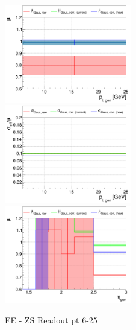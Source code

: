 \begin{figure}
\includegraphics[width=0.495\textwidth]{./plots_pdf/ECAL_plots/plotsNoPU/EE/pdf/ZS/GENPT/EEZS_GENPT_0006_0025_MuOverBins.pdf}
\includegraphics[width=0.495\textwidth]{./plots_pdf/ECAL_plots/plotsNoPU/EE/pdf/ZS/GENPT/EEZS_GENPT_0006_0025_EffSigmaOverBins.pdf}
\includegraphics[width=0.495\textwidth]{./plots_pdf/ECAL_plots/plotsNoPU/EE/pdf/ZS/GENETA/EEZS_GENETA_0006_0025_MuOverBins.pdf}
\caption{EE - ZS Readout pt 6-25}
\end{figure}



